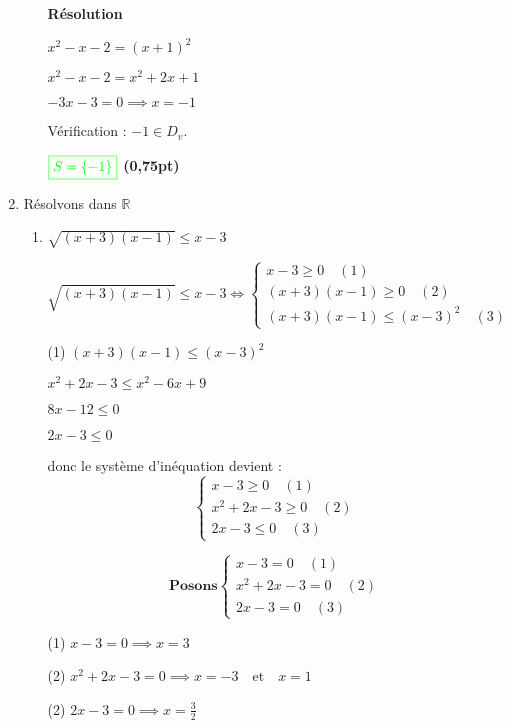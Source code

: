 \documentclass[12pt,a4paper]{article}
\begin{document}
\begin{enumerate}
\begin{enumerate}
\textbf{Résolution}

\( x^2 - x - 2 = (x+1)^2 \)

\( x^2 - x - 2 = x^2 + 2x + 1 \)

\( -3x - 3 = 0 \implies x = -1 \)

\noindent Vérification : \( -1 \in D_v \).  
 
\(
\textcolor{green}{\boxed{S = \{ -1 \}  }} 
\) \hfill \textbf{(0,75pt)}
    \end{enumerate} 
\item Résolvons dans \( \mathbb{R} \)

\begin{enumerate}
\item \(\sqrt{(x+3)(x-1)} \leq x-3\)

\[
\sqrt{(x+3)(x-1)} \leq x-3 \iff 
\begin{cases}
x-3 \geq 0 \quad (1) \\
(x+3)(x-1) \geq 0 \quad (2) \\
(x+3)(x-1) \leq (x-3)^2 \quad (3)
\end{cases}
\]
 
(1) \((x+3)(x-1) \leq (x-3)^2\)

\(
x^2 + 2x - 3 \leq x^2 - 6x + 9
\)

\(
8x - 12 \leq 0
\)

\(
2x - 3 \leq 0
\)

\noindent donc le système d'inéquation devient :  
\[
\begin{cases}
x-3 \geq 0 \quad (1) \\
x^2 + 2x - 3 \geq 0 \quad (2) \\
2x - 3 \leq 0 \quad (3)
\end{cases}
\]
 
\[\textbf{Posons}
\begin{cases}
x-3 = 0 \quad (1) \\
x^2 + 2x - 3 = 0 \quad (2) \\
2x - 3 = 0 \quad (3)
\end{cases}
\]
 
(1) \( x - 3 = 0 \implies x = 3 \)

(2) \( x^2 + 2x - 3 = 0 \implies x = -3 \quad \text{et} \quad x = 1 \)

(2)  \( 2x - 3 = 0 \implies x = \frac{3}{2} \)


\begin{flushleft}
\end{flushleft}
\end{enumerate}
\end{enumerate}
\end{document}
